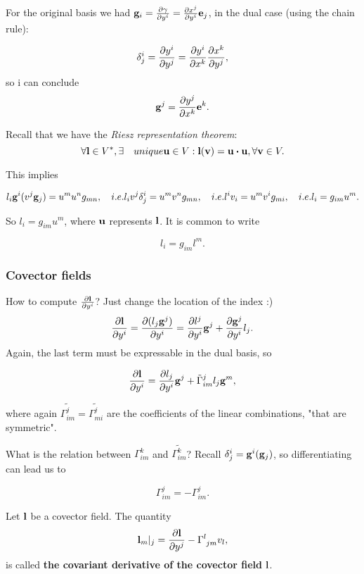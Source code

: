 \documentclass[reqno, a4paper]{article}
\begin{document}
For the original basis we had $\vb{g}_i = \pdv{\vb{\gamma}}{y^i} = \pdv{x^j}{y^i}\vb{e}_j$, in the dual case (using the chain rule):

\[
	\delta^i_j = \pdv{y^i}{y^j}= \pdv{y^i}{x^k}\pdv{x^k}{y^j},
\]
so i can conclude
\[
	\vb{g}^j = \pdv{y^j}{x^k}\vb{e}^k.
\]

Recall that we have the \textit{Riesz representation theorem}:
\[
	\forall \vb{l} \in V^{*}, \exists \quad{unique} \vb{u} \in V: \vb{l}(\vb{v}) = \vb{u} \vdot \vb{u}, \forall \vb{v} \in V.
\]

This implies

\[
	l_i \vb{g}^i (v^j \vb{g}_j) = u^m u^n g_{mn}, \quad{i.e.} l_i v^j \delta^i_j = u^m v^n g_{mn}, \quad{i.e.} l^i v_i = u^m v^i g_{mi}, \quad{i.e.} l_i = g_{im} u^m.
\]

So $l_i = g_{im}u^m$, where $\vb{u}$ represents $\vb{l}$. It is common to write

\[
	l_i = g_{im}l^m.
\]

\subsubsection{Covector fields}
\label{sec:covector_fields}

How to compute $\pdv{\vb{l}}{y^i}$? Just change the location of the index :)
\[
	\pdv{\vb{l}}{y^i} = \pdv{(l_j \vb{g}^j)}{y^i} = \pdv{l^j}{y^i}\vb{g}^j + \pdv{\vb{g}^j}{y^i}l_j.
\]
Again, the last term must be expressable in the dual basis, so 

\begin{equation}
	\pdv{\vb{l}}{y^i}= \pdv{l_j}{y^i}\vb{g}^j+ \tilde{\Gamma}^j_{im}l_j \vb{g}^m,
\end{equation}


where again $\tilde{\Gamma^j_{im}} = \tilde{\Gamma^j_{mi}}$ are the coefficients of the linear combinations, "that are symmetric".

What is the relation between $\Gamma^k_{im}$ and $\tilde{\Gamma^k_{im}}$? Recall $\delta^i_j = \vb{g}^i(\vb{g}_j)$, so differentiating can lead us to

\begin{equation}
	\label{eq:relationGammas}
    \Gamma^j_{im} = - \Gamma^j_{im}.
\end{equation}

\begin{definition}
    Let $\vb{l}$ be a covector field. The quantity
    \begin{equation}
        \vb{l}_m|_j = \pdv{\vb{l}}{y^j}-\Gamma \indices{^l_{jm}}v_l,
    \end{equation}
    is called \textbf{the covariant derivative of the covector field} $\vb{l}$.
\end{definition}
\end{document}
